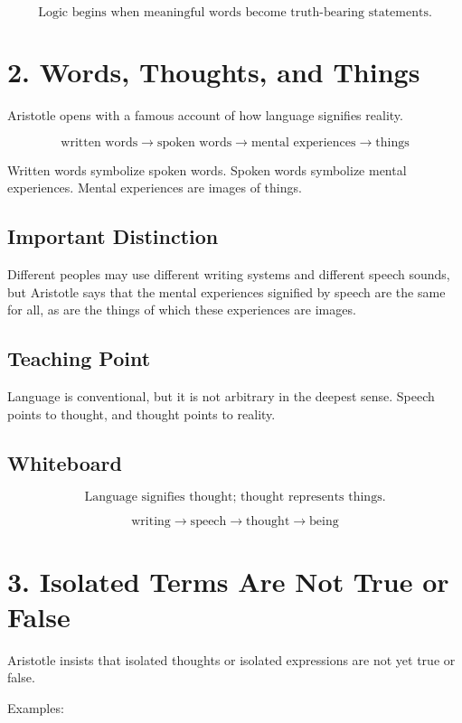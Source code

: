 \documentclass[12pt]{article}
\begin{document}
\[
\boxed{
\text{Logic begins when meaningful words become truth-bearing statements.}
}
\]

\section*{2. Words, Thoughts, and Things}

Aristotle opens with a famous account of how language signifies reality.

\[
\text{written words} \rightarrow \text{spoken words}
\rightarrow \text{mental experiences} \rightarrow \text{things}
\]

Written words symbolize spoken words. Spoken words symbolize mental
experiences. Mental experiences are images of things.

\subsection*{Important Distinction}

Different peoples may use different writing systems and different speech
sounds, but Aristotle says that the mental experiences signified by speech are
the same for all, as are the things of which these experiences are images.

\subsection*{Teaching Point}

Language is conventional, but it is not arbitrary in the deepest sense. Speech
points to thought, and thought points to reality.

\subsection*{Whiteboard}

\[
\boxed{
\text{Language signifies thought; thought represents things.}
}
\]

\[
\text{writing} \rightarrow \text{speech} \rightarrow \text{thought} \rightarrow \text{being}
\]

\section*{3. Isolated Terms Are Not True or False}

Aristotle insists that isolated thoughts or isolated expressions are not yet
true or false.

Examples:
\end{document}
